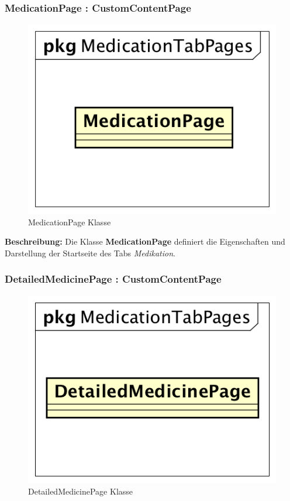 \documentclass[a4paper]{scrreprt}
\begin{document}
\subsubsection{MedicationPage : CustomContentPage}
\begin{figure}[H]
\centering
\includegraphics[width=0.45\textheight]{graphics/Klassendiagramme/View/MedicationPage.png}
\caption{MedicationPage Klasse}
\end{figure}

\textbf{Beschreibung:} Die Klasse \textbf{MedicationPage} definiert die Eigenschaften und Darstellung der Startseite des Tabs \textit{Medikation}.

\subsubsection{DetailedMedicinePage : CustomContentPage}
\begin{figure}[H]
\centering
\includegraphics[width=0.45\textheight]{graphics/Klassendiagramme/View/DetailedMedicinePage.png}
\caption{DetailedMedicinePage Klasse}
\end{figure}
\end{document}
